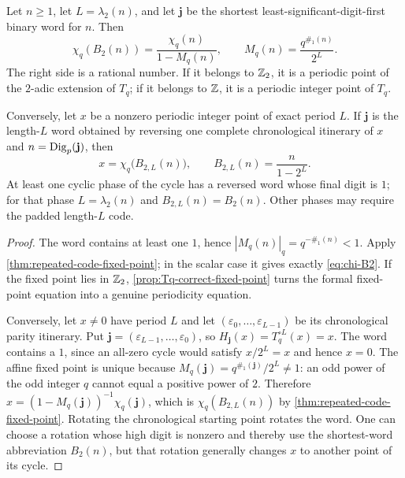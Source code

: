 \begin{theorem}
\label{thm:Tq-periodic-word-CP}
Let $n\geq1$, let $L=\lambda_2(n)$, and let $\mathbf j$ be the shortest
least-significant-digit-first binary word for $n$.  Then
\begin{equation}
\label{eq:chi-B2}
 \chi_q(B_2(n))
 =\frac{\chi_q(n)}{1-M_q(n)},
 \qquad
 M_q(n)=\frac{q^{\#_1(n)}}{2^L}.
\end{equation}
The right side is a rational number.  If it belongs to $\mathbb Z_2$, it is a
periodic point of the $2$-adic extension of $T_q$; if it belongs to $\mathbb Z$, it
is a periodic integer point of $T_q$.

Conversely, let $x$ be a nonzero periodic integer point of exact period $L$.
If $\mathbf j$ is the length-$L$ word obtained by reversing one complete
chronological itinerary of $x$ and $n=\operatorname{Dig}_p(\mathbf j)$, then
\begin{equation}
\label{eq:padded-cycle-code}
 x=\chi_q\bigl(B_{2,L}(n)\bigr),
 \qquad B_{2,L}(n)=\frac{n}{1-2^L}.
\end{equation}
At least one cyclic phase of the cycle has a reversed word whose final digit
is $1$; for that phase $L=\lambda_2(n)$ and
$B_{2,L}(n)=B_2(n)$.  Other phases may require the padded length-$L$ code.
\end{theorem}

\begin{proof}
The word contains at least one $1$, hence
$|M_q(n)|_q=q^{-\#_1(n)}<1$.  Apply
\cref{thm:repeated-code-fixed-point}; in the scalar case it gives exactly
\cref{eq:chi-B2}.  If the fixed point lies in $\mathbb Z_2$,
\cref{prop:Tq-correct-fixed-point} turns the formal fixed-point equation into
a genuine periodicity equation.

Conversely, let $x\ne0$ have period $L$ and let
$(\varepsilon_0,\ldots,\varepsilon_{L-1})$ be its chronological parity
itinerary.  Put
$\mathbf j=(\varepsilon_{L-1},\ldots,\varepsilon_0)$, so
$H_{\mathbf j}(x)=T_q^{\circ L}(x)=x$.  The word contains a $1$, since an
all-zero cycle would satisfy $x/2^L=x$ and hence $x=0$.  The affine fixed
point is unique because
$M_q(\mathbf j)=q^{\#_1(\mathbf j)}/2^L\ne1$: an odd power of the odd
integer $q$ cannot equal a positive power of $2$.  Therefore
$x=(1-M_q(\mathbf j))^{-1}\chi_q(\mathbf j)$, which is
$\chi_q(B_{2,L}(n))$ by \cref{thm:repeated-code-fixed-point}.  Rotating the
chronological starting point rotates the word.  One can choose a rotation
whose high digit is nonzero and thereby use the shortest-word abbreviation
$B_2(n)$, but that rotation generally changes $x$ to another point of its
cycle.
\end{proof}

